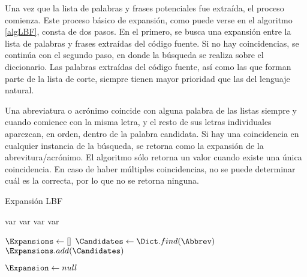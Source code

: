 Una vez que la lista de palabras y frases potenciales fue extraída, el proceso comienza. 
Este proceso básico de expansión, como puede verse en el algoritmo \ref{algLBF}, consta de dos pasos.
En el primero, se busca una expansión entre la lista de palabras y frases extraídas del código fuente.
Si no hay coincidencias, se continúa con el segundo paso, en donde la búsqueda se realiza sobre el diccionario.
Las palabras extraídas del código fuente, así como las que forman parte de la lista de corte, siempre tienen mayor prioridad que las del lenguaje natural.

Una abreviatura o acrónimo coincide con alguna palabra de las listas siempre y cuando comience con la misma letra, y el resto de sus letras individuales aparezcan, en orden, dentro de la palabra candidata.
Si hay una coincidencia en cualquier instancia de la búsqueda, se retorna como la expansión de la abrevitura/acrónimo.
El algoritmo sólo retorna un valor cuando existe una única coincidencia.
En caso de haber múltiples coincidencias, no se puede determinar cuál es la correcta, por lo que no se retorna ninguna.

\begin{algorithm}[H]
\caption{Expansión LBF}
\label{algLBF}
\DontPrintSemicolon
  
  
  \BlankLine
  var \WordList\;
  var \PhraseList\;
  var \StopList\;
  var \Dict\;
  
  \BlankLine
  \If{$\Abbrev \in \StopList$}{
    \KwRet \Abbrev\;
  }
  
  \BlankLine
  
  \BlankLine
  
  \BlankLine 
  $\Expansions \gets []$\;
  $\Candidates \gets \Dict.find(\Abbrev)$\;
  $\Expansions.add(\Candidates)$\;
  
  \BlankLine
  $\Expansion \gets null$\;
  
  \BlankLine
  \KwRet \Expansion\;

\end{algorithm}

